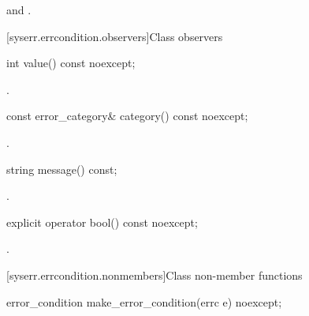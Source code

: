 \begin{itemdescr}
\postconditions {} and .
\end{itemdescr}

[syserr.errcondition.observers]{Class  observers}

\begin{itemdecl}
int value() const noexcept;
\end{itemdecl}

\begin{itemdescr}
\pnum
\returns {}.
\end{itemdescr}

\begin{itemdecl}
const error_category& category() const noexcept;
\end{itemdecl}

\begin{itemdescr}
\pnum
\returns {}.
\end{itemdescr}

\begin{itemdecl}
string message() const;
\end{itemdecl}

\begin{itemdescr}
\pnum
\returns {}.
\end{itemdescr}

\begin{itemdecl}
explicit operator bool() const noexcept;
\end{itemdecl}

\begin{itemdescr}
\pnum
\returns {}.
\end{itemdescr}

[syserr.errcondition.nonmembers]{Class  non-member functions}

\begin{itemdecl}
error_condition make_error_condition(errc e) noexcept;
\end{itemdecl}

